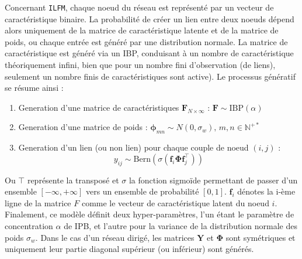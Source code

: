 \documentclass[french]{hermes-journal}
\newcommand{\ilfm}{\texttt{ILFM}}
\newcommand{\IBP}{\mathrm{IBP}}
\newcommand{\mat}[1]{\bm{#1}}
\begin{document}
Concernant \ilfm, chaque noeud du réseau est représenté par un vecteur de caractéristique binaire. La probabilité de créer un lien entre deux noeuds dépend alors uniquement de la matrice de caractéristique latente et de la matrice  de poids, ou chaque entrée est généré par une distribution normale. La matrice de caractéristique est généré via un IBP, conduisant à un nombre de caractéristique théoriquement infini, bien que pour un nombre fini d'observation (de liens), seulement un nombre finis de caractéristiques sont active). Le processus génératif se résume ainsi :
\begin{enumerate}
\item Generation d'une matrice de caractéristiques $\mat{F}_{N \times \infty}$ : $\mat{F} \sim \IBP(\alpha)$
\item Generation d'une matrice de poids : $\mat{\phi}_{mn} \sim N(0, \sigma_w), \, m,n \in \mathbb{N}^{+*}$
\item Generation d'un lien (ou non lien) pour chaque couple de noeud $(i,j)$ : 
\begin{equation*}
y_{ij} \sim \mathrm{Bern}(\sigma(\mat{f}_{i} \mat{\Phi} \mat{f}_{j}^\top))
\label{eq:link-ilfm}
\end{equation*}
\end{enumerate}
%

Ou $\top$ représente la transposé et $\sigma$ la fonction sigmoïde permettant de passer d'un ensemble $[-\infty, +\infty]$ vers un ensemble de probabilité $[0,1]$.  $\mat{f}_{i}$ dénotes la i-ème ligne de la matrice $F$ comme le vecteur de caractéristique latent du noeud $i$. Finalement, ce modèle définit deux hyper-paramètres, l'un étant le paramètre de concentration $\alpha$ de IPB, et l'autre pour la variance de la distribution normale des poids $\sigma_w$. Dans le cas d'un réseau dirigé, les matrices $\mat{Y}$ et $\mat{\Phi}$ sont symétriques et uniquement leur partie diagonal supérieur (ou inférieur) sont générés. ~\\
\end{document}
